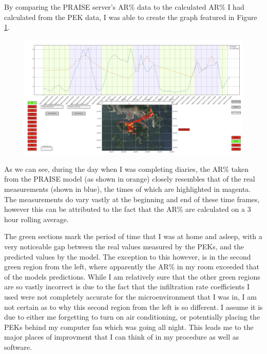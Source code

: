 \documentclass{article}
\begin{document}
\begin{multicols}{2}
By comparing the PRAISE server's AR\% data to the calculated AR\% I had calculated
from the PEK data, I was able to create the graph featured in Figure 
\ref{figure:AR_comparisons_1}.
\begin{figure}[!tp]
  \includegraphics[width=\linewidth]{AR_comparisons_1.png}
  \caption{\label{figure:AR_comparisons_1}}
\end{figure}

As we can see, during the day when I was completing diaries, the AR\% taken from 
the PRAISE model (as shown in orange) closely resembles that of the real measurements
(shown in blue), the times of which are highlighted in magenta. The measurements do vary
vastly at the beginning and end of these time frames, however this can be attributed to 
the fact that the AR\% are calculated on a 3 hour rolling average.

The green sections mark the period of time that I was at home and asleep, with a very
noticeable gap between the real values measured by the PEKs, and the predicted values 
by the model. The exception to this however, is in the second green region from the left, 
where apparently the AR\% in my room exceeded that of the models predictions. While I 
am relatively sure that the other green regions are so vastly incorrect is due to the fact 
that the infiltration rate coefficients I used were not completely accurate for the 
microenvironment that I was in, I am not certain as to why this second region from the 
left is so different. I assume it is due to either me forgetting to turn on air conditioning, 
or potentially placing the PEKs behind my computer fan which was going all night. This leads
me to the major places of improvment that I can think of in my procedure as well as software.


\end{multicols}
\end{document}
